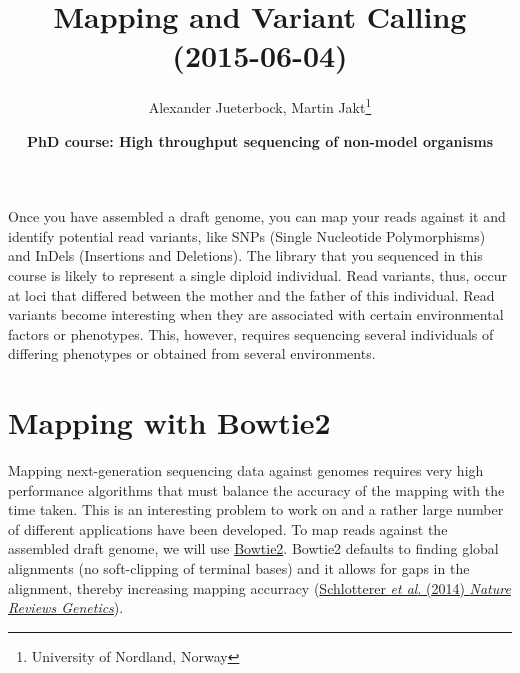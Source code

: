 \documentclass[11pt]{article}
\author{Alexander Jueterbock, Martin Jakt\thanks{University of Nordland, Norway}}
\date{\textbf{PhD course: High throughput sequencing of non-model organisms}}
\title{\textbf{Mapping and Variant Calling} (2015-06-04)}
\begin{document}
\maketitle
\tableofcontents

Once you have assembled a draft genome, you can map your reads against it
and identify potential read variants, like SNPs (Single Nucleotide
Polymorphisms) and InDels (Insertions and Deletions). The library that
you sequenced in this course is likely to represent a single diploid
individual. Read variants, thus, occur at loci that differed between
the mother and the father of this individual. Read variants become
interesting when they are associated with certain environmental
factors or phenotypes. This, however, requires sequencing several
individuals of differing phenotypes or obtained from several  
environments.

\section{Mapping with Bowtie2}
\label{sec:orgheadline3}
Mapping next-generation sequencing data against genomes requires very high
performance algorithms that must balance the accuracy of the mapping with the
time taken. This is an interesting problem to work on and a rather large
number of different applications have been developed. 
To map reads against the assembled draft genome, we will use \href{http://bowtie-bio.sourceforge.net/bowtie2/index.shtml}{Bowtie2}.
Bowtie2 defaults to finding global alignments (no soft-clipping of
terminal bases) and it allows for gaps in the alignment, thereby
increasing mapping accurracy (\href{http://www.nature.com/nrg/journal/v15/n11/full/nrg3803.html}{Schlotterer \emph{et al}. (2014) \emph{Nature
Reviews Genetics}}). 
\end{document}
